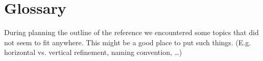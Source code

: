 \section{Glossary}
\label{reference_05}

During planning the outline of the reference we encountered some topics that did not seem to fit anywhere. This might be a good place to put such things. (E.g. horizontal vs. vertical refinement, naming convention, \ldots)
